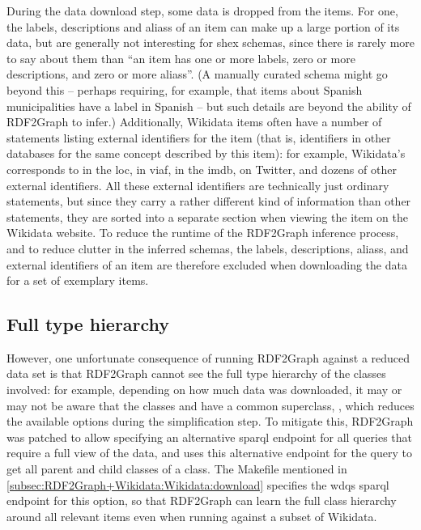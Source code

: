 During the data download step, some data is dropped from the \glspl{item}.
For one, the \glspl{label}, \glspl{description} and \glspl{alias} of an \gls{item} can make up a large portion of its data,
but are generally not interesting for \gls{shex} \glspl{schema},
since there is rarely more to say about them than
“an \gls{item} has one or more \glspl{label}, zero or more \glspl{description}, and zero or more \glspl{alias}”.
(A manually curated \gls{schema} might go beyond this –
perhaps requiring, for example, that \glspl{item} about Spanish municipalities have a label in Spanish –
but such details are beyond the ability of \gls{RDF2Graph} to infer.)
Additionally, \gls{Wikidata} \glspl{item} often have a number of \glspl{statement} listing external identifiers for the \gls{item}
(that is, identifiers in other databases for the same concept described by this \gls{item}):
for example, \gls{Wikidata}’s  corresponds to  in the \gls{loc},
 in \gls{viaf},
 in the \gls{imdb},
 on Twitter,
and dozens of other external identifiers.
All these external identifiers are technically just ordinary \glspl{statement},
but since they carry a rather different kind of information than other \glspl{statement},
they are sorted into a separate section when viewing the \gls{item} on the \gls{Wikidata} website.
To reduce the runtime of the \gls{RDF2Graph} inference process,
and to reduce clutter in the inferred \glspl{schema},
the \glspl{label}, \glspl{description}, \glspl{alias}, and external identifiers of an \gls{item}
are therefore excluded when downloading the data for a set of exemplary \glspl{item}.

\subsection{Full type hierarchy}
\label{subsec:RDF2Graph+Wikidata:Wikidata:hierarchy}

However, one unfortunate consequence of running \gls{RDF2Graph} against a reduced data set
is that \gls{RDF2Graph} cannot see the full type hierarchy of the classes involved:
for example, depending on how much data was downloaded,
it may or may not be aware that the classes  and 
have a common superclass, ,
which reduces the available options during the simplification step. %
To mitigate this, \gls{RDF2Graph} was patched
to allow specifying an alternative \gls{sparql} endpoint for all queries that require a full view of the data,
and uses this alternative endpoint for the query to get all parent and child classes of a class.
The Makefile mentioned in \cref{subsec:RDF2Graph+Wikidata:Wikidata:download}
specifies the \gls{wdqs} \gls{sparql} endpoint for this option,
so that \gls{RDF2Graph} can learn the full class hierarchy around all relevant items %
even when running against a subset of \gls{Wikidata}. %

